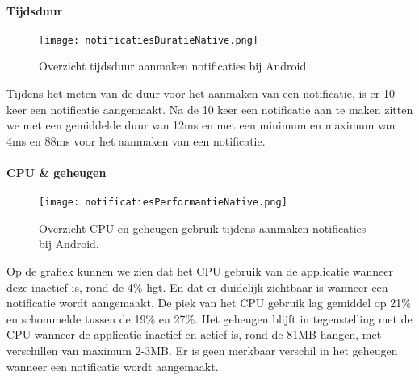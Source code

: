 \paragraph{Tijdsduur}
\begin{figure}[H]
    \centering
    \texttt{[image: notificatiesDuratieNative.png]}
    \caption{Overzicht tijdsduur aanmaken notificaties bij Android.}
\end{figure}
Tijdens het meten van de duur voor het aanmaken van een notificatie, is er 
10 keer een notificatie aangemaakt. Na de 10 keer een notificatie aan te maken zitten we met 
een gemiddelde duur van 12ms en met een minimum en 
maximum van 4ms en 88ms voor het aanmaken van een notificatie.

\paragraph{CPU \& geheugen}
\begin{figure}[H]
    \centering
    \texttt{[image: notificatiesPerformantieNative.png]}
    \caption{Overzicht CPU en geheugen gebruik tijdens aanmaken notificaties bij Android.}
\end{figure}
Op de grafiek kunnen we zien dat het CPU gebruik van de applicatie wanneer deze inactief is, rond de 4\% ligt. 
En dat er duidelijk zichtbaar is wanneer een notificatie wordt aangemaakt. De piek van het CPU gebruik lag 
gemiddel op 21\% en schommelde tussen de 19\% en 27\%. Het geheugen blijft in tegenstelling met de CPU 
wanneer de applicatie inactief en actief is, rond de 81MB hangen, met verschillen van maximum 2-3MB. Er is geen 
merkbaar verschil in het geheugen wanneer een notificatie wordt aangemaakt.
  